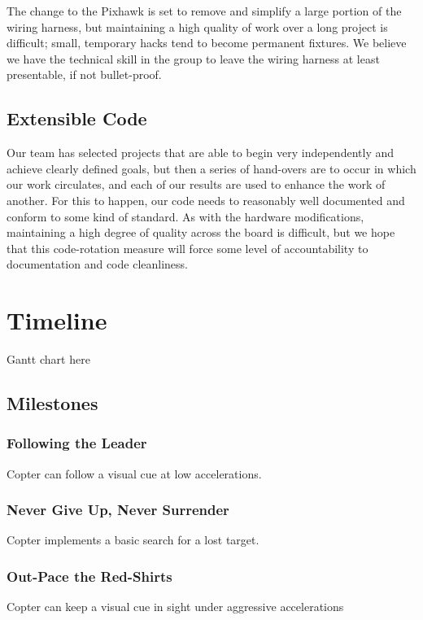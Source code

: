 \documentclass[11pt]{article}
\begin{document}
      The change to the Pixhawk is set to remove and simplify a large portion of the wiring harness, but maintaining a high quality of work over a long project is difficult; small, temporary hacks tend to become permanent fixtures.  We believe we have the technical skill in the group to leave the wiring harness at least presentable, if not bullet-proof.

    \subsection{Extensible Code}
      Our team has selected projects that are able to begin very independently and achieve clearly defined goals, but then a series of hand-overs are to occur in which our work circulates, and each of our results are used to enhance the work of another.
      For this to happen, our code needs to reasonably well documented and conform to some kind of standard.  As with the hardware modifications, maintaining a high degree of quality across the board is difficult, but we hope that this code-rotation measure will force some level of accountability to documentation and code cleanliness.




  \section{Timeline}
    Gantt chart here
    \subsection{Milestones}

    \subsubsection{Following the Leader}
      Copter can follow a visual cue at low accelerations.

    \subsubsection{Never Give Up, Never Surrender}
      Copter implements a basic search for a lost target.

    \subsubsection{Out-Pace the Red-Shirts}
      Copter can keep a visual cue in sight under aggressive accelerations
\end{document}
